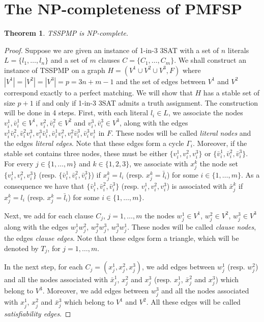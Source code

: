 \documentclass{article}
\theoremstyle{plain}
\newtheorem{theorem}{Theorem}
\theoremstyle{definition}
\begin{document}
\section{The NP-completeness of PMFSP}
\begin{theorem}
\label{theorem_3}
TSSPMP is NP-complete.
\end{theorem}
\begin{proof}
Suppose we are given an instance of 1-in-3 3SAT with a set of $n$ literals $L=\{l_1,\dots,l_n\}$ and a set of $m$ clauses $C=\{C_1,\dots,C_m\}$. We shall construct an instance of TSSPMP on a graph $H=(V^1\cup V^2\cup V^3,F)$ where $|V^1|=|V^2|=|V^3|=p=3n+m-1$ and the set of edges between $V^1$ and $V^2$ correspond exactly to a perfect matching. We will show that $H$ has a stable set of size $p+1$ if and only if 1-in-3 3SAT admits a truth assignment. The construction will be done in 4 steps. First, with each literal $l_i\in L$, we associate the nodes $v^1_i,\bar{v}^1_i\in V^1$, $v^2_i,\bar{v}^2_i\in V^2$ and $v^3_i,\bar{v}^3_i\in V^3$, along with the edges $v^1_i\bar{v}^2_i,\bar{v}^2_iv^3_i,v^3_i\bar{v}^1_i,\bar{v}^1_iv^2_i,v^2_i\bar{v}^3_i,\bar{v}^3_iv^1_i$ in $F$. These nodes will be called {\em literal nodes} and the edges {\em literal edges}. Note that these edges form a cycle $\Gamma_i$. Moreover, if the stable set contains three nodes, these must be either $\{v^1_i,v^2_i,v^3_i\}$ or $\{\bar{v}^1_i,\bar{v}^2_i,\bar{v}^3_i\}$. For every $j\in\{1,\dots,m\}$ and $k\in\{1,2,3\}$, we associate with $x_j^k$ the node set $\{v^1_i,v^2_i,v^3_i\}$ (resp. $\{\bar{v}^1_i,\bar{v}^2_i,\bar{v}^3_i\}$) if $x_j^k=l_i$ (resp. $x_j^k=\bar{l}_i$) for some $i\in\{1,\dots,m\}$. As a consequence we have that $\{\bar{v}^1_i,\bar{v}^2_i,\bar{v}^3_i\}$ (resp. $v^1_i,v^2_i,v^3_i$) is associated with $\bar{x}_j^k$ if $x_j^k=l_i$ (resp. $x_j^k=\bar{l}_i$) for some $i\in\{1,\dots,m\}$.

Next, we add for each clause $C_j$, $j=1,\dots,m$ the nodes $w^1_j\in V^1$, $w^2_j\in V^2$, $w^3_j\in V^3$ along with the edges $w^1_jw^2_j$, $w^2_jw^3_j$, $w^3_jw^1_j$. These nodes will be called {\em clause nodes}, the edges {\em clause edges}. Note that these edges form a triangle, which will be denoted by $T_j$, for $j=1,\dots,m$.

In the next step, for each $C_j=(x_j^1,x_j^2,x_j^3)$, we add edges between $w^1_j$ (resp. $w^2_j$) and all the nodes associated with $\bar{x}_j^1$, $x_j^2$ and $x_j^3$ (resp. $x_j^1$, $\bar{x}_j^2$ and $x_j^3$) which belong to $V^3$. Moreover, we add edges between $w^3_j$ and all the nodes associated with $x_j^1$, $x_j^2$ and $\bar{x}_j^3$ which belong to $V^1$ and $V^2$. All these edges will be called {\em satisfiability edges}.


\end{proof}
\end{document}
